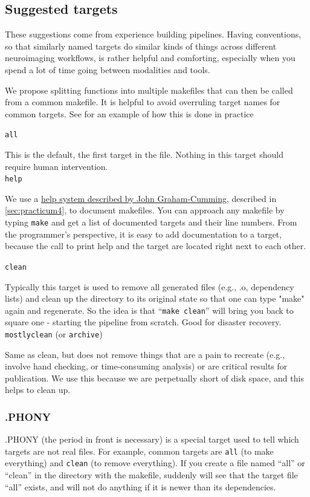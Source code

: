 \subsection{Suggested targets}
These suggestions come from experience building pipelines. Having conventions, so that similarly named targets do similar kinds of things across different neuroimaging workflows, is rather helpful and comforting, especially when you spend a lot of time going between modalities and tools.

We propose splitting functions into multiple makefiles that can then be called from a common makefile. It is helpful to avoid overruling target names for common targets. See  for an example of how this is done in practice

\texttt{all}

This is the default, the first target in the file. Nothing in this target should require human intervention. \\

\texttt{help} 

We use a \href{http://www.cmcrossroads.com/article/self-documenting-makefiles}{help system described by John Graham-Cumming}, described in \autoref{sec:practicum4}, to document makefiles. You can approach any makefile by typing \texttt{make} and get a list of documented targets and their line numbers. From the programmer's perspective, it is easy to add documentation to a target, because the call to print help and the target are located right next to each other. 

\texttt{clean} 

Typically this target is used to remove all generated files (e.g., .o, dependency lists) and clean up the directory to its original state so that one can type "make" again and regenerate. So the idea is that ``\texttt{make clean}'' will bring you back to square one - starting the pipeline from scratch. Good for disaster recovery. \\

\texttt{mostlyclean} (or \texttt{archive})

Same as clean, but does not remove things that are a pain to recreate (e.g., involve hand checking, or time-consuming analysis) or are critical results for publication. We use this because we are perpetually short of disk space, and this helps to clean up.  \\



\subsubsection{.PHONY}
.PHONY (the period in front is necessary) is a special target used to tell \maken{} which targets are not real files. For example, common targets are \texttt{all} (to make everything) and \texttt{clean} (to remove everything). If you create a file named ``all'' or ``clean'' in the directory with the makefile, suddenly \maken{} will see that the target file ``all'' exists, and will not do anything if it is newer than its dependencies.

